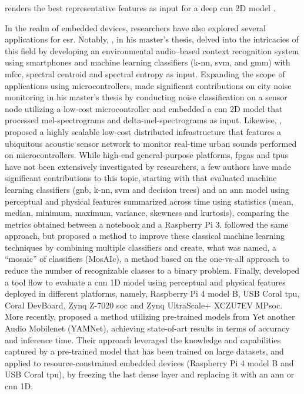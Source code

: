 renders the best representative features as input for a deep \gls{cnn} 2D model \cite{Tripathi2021}.

In the realm of embedded devices, researchers have also explored several applications for \gls{esr}. Notably, \textcite{Abreha2014}, in his master's thesis, delved into the intricacies of this field by developing an environmental audio–based context recognition system using smartphones and machine learning classifiers (\gls{k-nn}, \gls{svm}, and \gls{gmm}) with \gls{mfcc}, spectral centroid and spectral entropy as input. Expanding the scope of applications using microcontrollers, \textcite{Nordby2019} made significant contributions on city noise monitoring in his master’s thesis by conducting noise classification on a sensor node utilizing a low-cost microcontroller and embedded a \gls{cnn} 2D model that processed mel-spectrograms and delta-mel-spectrograms as input. Likewise, \textcite{VidaaVila2020}, proposed a highly scalable low-cost distributed infrastructure that features a ubiquitous acoustic sensor network to monitor real-time urban sounds performed on microcontrollers. While high-end general-purpose platforms, \gls{fpga}s and \gls{tpu}s have not been extensively investigated by researchers, a few authors have made significant contributions to this topic, starting with \textcite{Silva2019} that evaluated machine learning classifiers (\gls{gnb}, \gls{k-nn}, \gls{svm} and decision trees) and an \gls{ann} model using perceptual and physical features summarized across time using statistics (mean, median, minimum, maximum, variance, skewness and kurtosis), comparing the metrics obtained between a notebook and a Raspberry Pi 3. \textcite{Lhoest2021} followed the same approach, but proposed a method to improve these classical machine learning techniques by combining multiple classifiers and create, what was named, a “mosaic” of classifiers (MosAIc), a method based on the one-vs-all approach to reduce the number of recognizable classes to a binary problem. Finally, \textcite{Vandendriessche2021} developed a tool flow to evaluate a \gls{cnn} 1D model using perceptual and physical features deployed in different platforms, namely, Raspberry Pi 4 model B, USB Coral \gls{tpu}, Coral DevBoard, Zynq Z-7020 \gls{soc} and Zynq UltraScale+ XCZU7EV MP\gls{soc}. More recently, \textcite{Lamrini2023} proposed a method utilizing pre-trained models from Yet another Audio Mobilenet (YAMNet), achieving state-of-art results in terms of accuracy and inference time. Their approach leveraged the knowledge and capabilities captured by a pre-trained model that has been trained on large datasets, and applied to resource-constrained embedded devices (Raspberry Pi 4 model B and USB Coral \gls{tpu}), by freezing the last dense layer and replacing it with an \gls{ann} or \gls{cnn} 1D. 


